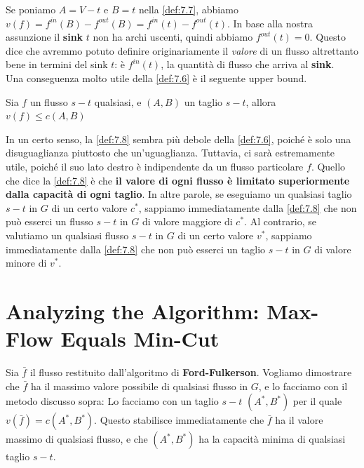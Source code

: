Se poniamo $A = V - {t}$ e $B = {t}$ nella \ref{def:7.7}, abbiamo
$v(f) = f^{in}(B) - f^{out}(B) = f^{in}(t) - f^{out}(t)$. In base alla
nostra assunzione il \textbf{sink} $t$ non ha archi uscenti, quindi
abbiamo $f^{out}(t) = 0$. Questo dice che avremmo potuto definire
originariamente il \emph{valore} di un flusso altrettanto bene in
termini del sink $t$: è $f^{in}(t)$, la quantità di flusso che
arriva al \textbf{sink}.\\

Una conseguenza molto utile della \ref{def:7.6} è il seguente upper bound.

\begin{myblockquote}
  \begin{minipage}{\textwidth}
    \begin{definition}\label{def:7.8}
      Sia $f$ un flusso $s-t$ qualsiasi, e $(A, B)$ un taglio $s-t$, allora
      $
        v(f) \le c(A, B)
      $
    \end{definition}
  \end{minipage}
\end{myblockquote}

In un certo senso, la \ref{def:7.8} sembra più debole della \ref{def:7.6},
poiché è solo una disuguaglianza piuttosto che un'uguaglianza. Tuttavia, ci sarà
estremamente utile, poiché il suo lato destro è indipendente da un flusso
particolare $f$. Quello che dice la \ref{def:7.8} è che \textbf{il valore di
  ogni flusso è limitato superiormente dalla capacità di ogni taglio}. In altre
parole, se eseguiamo un qualsiasi taglio $s-t$ in $G$ di un certo valore
$c^{*}$, sappiamo immediatamente dalla \ref{def:7.8} che non può esserci un
flusso $s-t$ in $G$ di valore maggiore di $c^{*}$. Al contrario, se valutiamo un
qualsiasi flusso $s-t$ in $G$ di un certo valore $v^{*}$, sappiamo
immediatamente dalla \ref{def:7.8} che non può esserci un taglio $s-t$ in $G$ di valore
minore di $v^{*}$.

\section{Analyzing the Algorithm: Max-Flow Equals Min-Cut}

Sia $\bar{f}$ il flusso restituito dall'algoritmo di
\textbf{Ford-Fulkerson}. Vogliamo dimostrare che $\bar{f}$ ha il
massimo valore possibile di qualsiasi flusso in $G$, e lo facciamo con
il metodo discusso sopra: Lo facciamo con un taglio $s-t$
$(A^{*} , B^{*})$ per il quale $v(\bar{f}) = c(A^{*} , B^{*})$. Questo
stabilisce immediatamente che $\bar{f}$ ha il valore massimo di
qualsiasi flusso, e che $(A^{*} , B^{*})$ ha la capacità minima di
qualsiasi taglio $s-t$.\\

